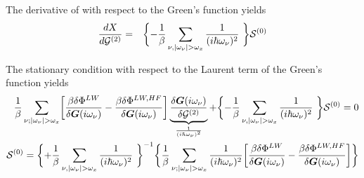 \documentclass[11pt,a4paper]{report}
\begin{document}
The derivative of  with respect to the Green's function
yields
\begin{eqnarray}
\frac{dX}{d\mathcal{\mat{G}}^{(2)}}
&=&
\biggl\lbrace
-\frac{1}{\beta}\sum_{\nu,|\omega_\nu|>\omega_x}\frac{1}{(i\hbar\omega_\nu)^2}\
\biggr\rbrace
\mathcal{\mat{S}}^{(0)}
\end{eqnarray}

The stationary condition with respect to the Laurent term of the
Green's function yields
\begin{eqnarray}
\frac{1}{\beta}\sum_{\nu;|\omega_\nu|>\omega_x}
\biggl[
\frac{\beta\delta\Phi^{LW}}{\delta\mat{G}(i\omega_\nu)}
-\frac{\beta\delta\Phi^{LW,HF}}{\delta\mat{G}(i\omega_\nu)}
\biggr]
\underbrace{
\frac{\delta\mat{G}(i\omega_\nu)}{\delta\mathcal{\mat{G}}^{(2)}}
}_{\frac{1}{(i\hbar\omega_\nu)^2}}
+
\biggl\lbrace
-\frac{1}{\beta}\sum_{\nu,|\omega_\nu|>\omega_x}\frac{1}{(i\hbar\omega_\nu)^2}\
\biggr\rbrace
\mathcal{\mat{S}}^{(0)}=0
%
\nonumber\\
\mathcal{\mat{S}}^{(0)}=
\biggl\lbrace
+\frac{1}{\beta}\sum_{\nu,|\omega_\nu|>\omega_x}\frac{1}{(i\hbar\omega_\nu)^2}\
\biggr\rbrace^{-1}
\biggl\lbrace
\frac{1}{\beta}\sum_{\nu;|\omega_\nu|>\omega_x}
\frac{1}{(i\hbar\omega_\nu)^2}
\biggl[
\frac{\beta\delta\Phi^{LW}}{\delta\mat{G}(i\omega_\nu)}
-\frac{\beta\delta\Phi^{LW,HF}}{\delta\mat{G}(i\omega_\nu)}
\biggr]
\biggr\rbrace
\end{eqnarray}


\end{document}
